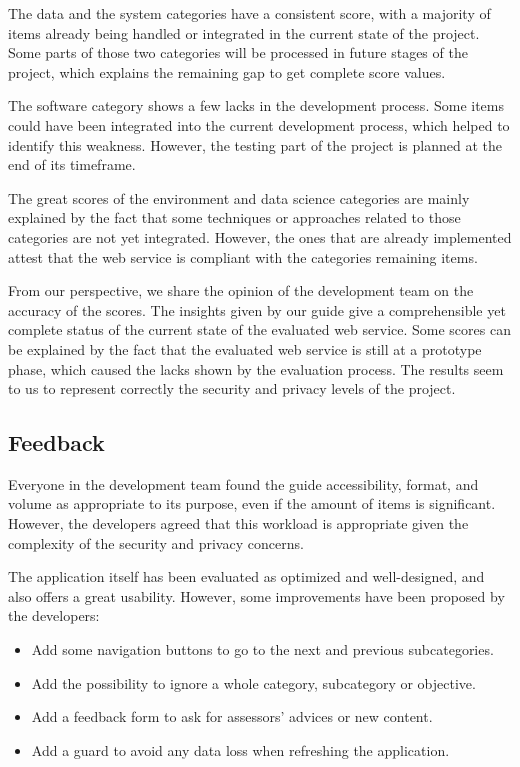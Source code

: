 The data and the system categories have a consistent score, with a majority of items already being handled or integrated in the current state of the project. Some parts of those two categories will be processed in future stages of the project, which explains the remaining gap to get complete score values.

The software category shows a few lacks in the development process. Some items could have been integrated into the current development process, which helped to identify this weakness. However, the testing part of the project is planned at the end of its timeframe.

The great scores of the environment and data science categories are mainly explained by the fact that some techniques or approaches related to those categories are not yet integrated. However, the ones that are already implemented attest that the web service is compliant with the categories remaining items.

From our perspective, we share the opinion of the development team on the accuracy of the scores. The insights given by our guide give a comprehensible yet complete status of the current state of the evaluated web service. Some scores can be explained by the fact that the evaluated web service is still at a prototype phase, which caused the lacks shown by the evaluation process. The results seem to us to represent correctly the security and privacy levels of the  project.

\subsection{Feedback}
\label{subsec:use_results_feedback}

Everyone in the development team found the guide accessibility, format, and volume as appropriate to its purpose, even if the amount of items is significant. However, the developers agreed that this workload is appropriate given the complexity of  the security and privacy concerns.

The application itself has been evaluated as optimized and well-designed, and also offers a great usability. However, some improvements have been proposed by the developers:
\begin{itemize}
	\item Add some navigation buttons to go to the next and previous subcategories.
	\item Add the possibility to ignore a whole category, subcategory or objective.
	\item Add a feedback form to ask for assessors' advices or new content.
	\item Add a guard to avoid any data loss when refreshing the application.
\end{itemize}

